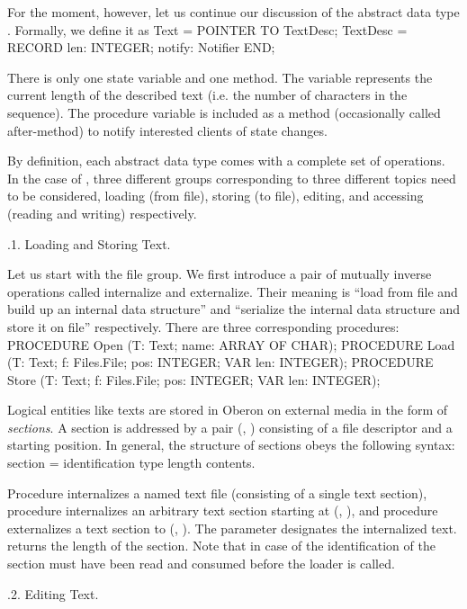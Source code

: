 For the moment, however, let us continue our discussion of the
abstract data type . Formally, we define it as
\begintt
Text = POINTER TO TextDesc;
TextDesc = RECORD
  len: INTEGER;
  notify: Notifier
END;
\endtt

\noindent There is only one state variable and one method. The variable  represents the current length of the described text (i.e. the number
of characters in the sequence). The procedure variable  is
included as a method (occasionally called after-method) to notify
interested clients of state changes.

By definition, each abstract data type comes with a complete set of
operations. In the case of , three different groups corresponding
to three different topics need to be considered, loading (from file),
storing (to file), editing, and accessing (reading and writing)
respectively.

.1. Loading and Storing Text.

Let us start with the file group. We first introduce a pair of
mutually inverse operations called internalize and externalize. Their
meaning is ``load from file and build up an internal data structure''
and ``serialize the internal data structure and store it on file''
respectively. There are three corresponding procedures:
\begintt
PROCEDURE Open (T: Text; name: ARRAY OF CHAR);
PROCEDURE Load (T: Text; f: Files.File; pos: INTEGER; VAR len: INTEGER);
PROCEDURE Store (T: Text; f: Files.File; pos: INTEGER; VAR len: INTEGER);
\endtt

\noindent Logical entities like texts are stored in Oberon on external media in the form of \emph{sections}. A section is addressed by a pair (, ) consisting of a file descriptor and a starting position. In general, the structure of sections obeys the following syntax:
\begintt
section = identification type length contents.
\endtt

\noindent Procedure  internalizes a named text file (consisting of a single text section), procedure  internalizes an arbitrary text section starting at (, ), and procedure  externalizes a text section to (, ). The parameter  designates the internalized text.  returns the length of the section. Note that in case of  the identification of the section must have been read and consumed before the loader is called.

.2. Editing Text.

